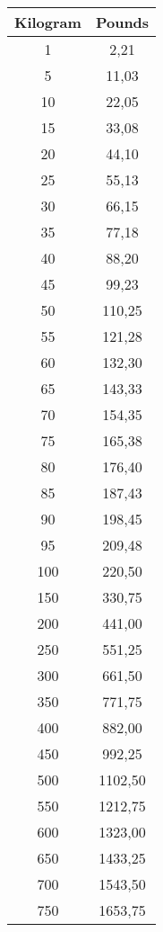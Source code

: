 \begin{table}[!ht]
  \centering
  \tiny
  \begin{tabular}{|c|c|}
  \hline
  \cellcolor{black!90}\color{white}\textbf{Kilogram} & \cellcolor{black!90}\color{white}\textbf{Pounds} \\ \hline
      1 & 2,21 \\ \hline
      5 & 11,03 \\ \hline
      10 & 22,05 \\ \hline
      15 & 33,08 \\ \hline
      20 & 44,10 \\ \hline
      25 & 55,13 \\ \hline
      30 & 66,15 \\ \hline
      35 & 77,18 \\ \hline
      40 & 88,20 \\ \hline
      45 & 99,23 \\ \hline
      50 & 110,25 \\ \hline
      55 & 121,28 \\ \hline
      60 & 132,30 \\ \hline
      65 & 143,33 \\ \hline
      70 & 154,35 \\ \hline
      75 & 165,38 \\ \hline
      80 & 176,40 \\ \hline
      85 & 187,43 \\ \hline
      90 & 198,45 \\ \hline
      95 & 209,48 \\ \hline
      100 & 220,50 \\ \hline
      150 & 330,75 \\ \hline
      200 & 441,00 \\ \hline
      250 & 551,25 \\ \hline
      300 & 661,50 \\ \hline
      350 & 771,75 \\ \hline
      400 & 882,00 \\ \hline
      450 & 992,25 \\ \hline
      500 & 1102,50 \\ \hline
      550 & 1212,75 \\ \hline
      600 & 1323,00 \\ \hline
      650 & 1433,25 \\ \hline
      700 & 1543,50 \\ \hline
      750 & 1653,75 \\ \hline

\end{tabular}
\end{table}
